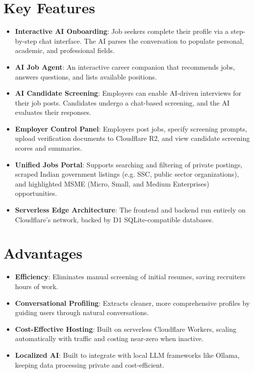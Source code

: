 \documentclass[12pt,a4paper]{report}
\begin{document}
\section{Key Features}
\begin{itemize}
    \item \textbf{Interactive AI Onboarding}: Job seekers complete their profile via a step-by-step chat interface. The AI parses the conversation to populate personal, academic, and professional fields.
    \item \textbf{AI Job Agent}: An interactive career companion that recommends jobs, answers questions, and lists available positions.
    \item \textbf{AI Candidate Screening}: Employers can enable AI-driven interviews for their job posts. Candidates undergo a chat-based screening, and the AI evaluates their responses.
    \item \textbf{Employer Control Panel}: Employers post jobs, specify screening prompts, upload verification documents to Cloudflare R2, and view candidate screening scores and summaries.
    \item \textbf{Unified Jobs Portal}: Supports searching and filtering of private postings, scraped Indian government listings (e.g. SSC, public sector organizations), and highlighted MSME (Micro, Small, and Medium Enterprises) opportunities.
    \item \textbf{Serverless Edge Architecture}: The frontend and backend run entirely on Cloudflare's network, backed by D1 SQLite-compatible databases.
\end{itemize}

\section{Advantages}
\begin{itemize}
    \item \textbf{Efficiency}: Eliminates manual screening of initial resumes, saving recruiters hours of work.
    \item \textbf{Conversational Profiling}: Extracts cleaner, more comprehensive profiles by guiding users through natural conversations.
    \item \textbf{Cost-Effective Hosting}: Built on serverless Cloudflare Workers, scaling automatically with traffic and costing near-zero when inactive.
    \item \textbf{Localized AI}: Built to integrate with local LLM frameworks like Ollama, keeping data processing private and cost-efficient.
\end{itemize}
\end{document}
